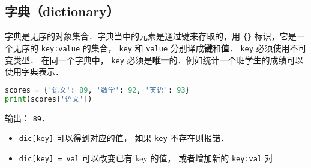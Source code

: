 \subsection{字典（dictionary）}
字典是无序的对象集合．字典当中的元素是通过键来存取的，用 \verb|{}| 标识，它是一个无序的 \verb|key:value| 的集合， \verb|key| 和 \verb|value| 分别译成\textbf{键}和\textbf{值}． \verb|key| 必须使用不可变类型． 在同一个字典中， \verb|key| 必须是\textbf{唯一}的．例如统计一个班学生的成绩可以使用字典表示．
\begin{lstlisting}[language=python]
scores = {'语文': 89, '数学': 92, '英语': 93}
print(scores['语文'])
\end{lstlisting}
输出： \verb|89|．

\begin{itemize}
\item \verb|dic[key]| 可以得到对应的值， 如果 \verb|key| 不存在则报错．
\item \verb|dic[key] = val| 可以改变已有 key 的值， 或者增加新的 \verb|key:val| 对
\end{itemize}
